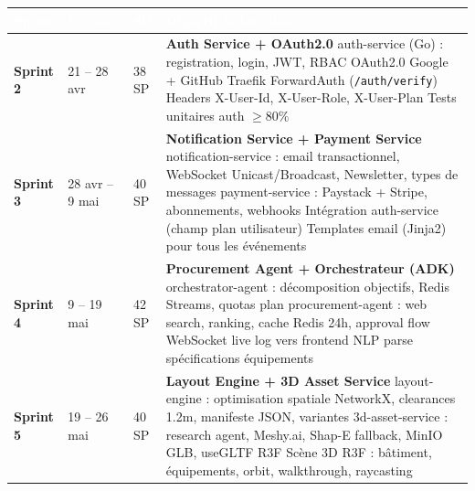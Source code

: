 \documentclass[12pt,a4paper]{article}
\begin{document}
\begin{tabularx}{\textwidth}{|l|l|l|X|}
\hline
\rowcolor{tablehead}
\textcolor{white}{\textbf{Sprint}} &
\textcolor{white}{\textbf{Période}} &
\textcolor{white}{\textbf{SP}} &
\textcolor{white}{\textbf{Objectif \& Livrables}} \\
\hline
\textbf{Sprint 2} & 21 -- 28 avr & 38 SP &
\textbf{Auth Service + OAuth2.0}
\newline auth-service (Go) : registration, login, JWT, RBAC
\newline OAuth2.0 Google + GitHub
\newline Traefik ForwardAuth (\texttt{/auth/verify})
\newline Headers X-User-Id, X-User-Role, X-User-Plan
\newline Tests unitaires auth $\geq 80\%$ \\
\hline
\rowcolor{tablerow}
\textbf{Sprint 3} & 28 avr -- 9 mai & 40 SP &
\textbf{Notification Service + Payment Service}
\newline notification-service : email transactionnel, WebSocket Unicast/Broadcast, Newsletter, types de messages
\newline payment-service : Paystack + Stripe, abonnements, webhooks
\newline Intégration auth-service (champ plan utilisateur)
\newline Templates email (Jinja2) pour tous les événements \\
\hline
\textbf{Sprint 4} & 9 -- 19 mai & 42 SP &
\textbf{Procurement Agent + Orchestrateur (ADK)}
\newline orchestrator-agent : décomposition objectifs, Redis Streams, quotas plan
\newline procurement-agent : web search, ranking, cache Redis 24h, approval flow
\newline WebSocket live log vers frontend
\newline NLP parse spécifications équipements \\
\hline
\rowcolor{tablerow}
\textbf{Sprint 5} & 19 -- 26 mai & 40 SP &
\textbf{Layout Engine + 3D Asset Service}
\newline layout-engine : optimisation spatiale NetworkX, clearances 1.2m, manifeste JSON, variantes
\newline 3d-asset-service : research agent, Meshy.ai, Shap-E fallback, MinIO GLB, useGLTF R3F
\newline Scène 3D R3F : bâtiment, équipements, orbit, walkthrough, raycasting \\
\hline

\end{tabularx}
\end{document}
